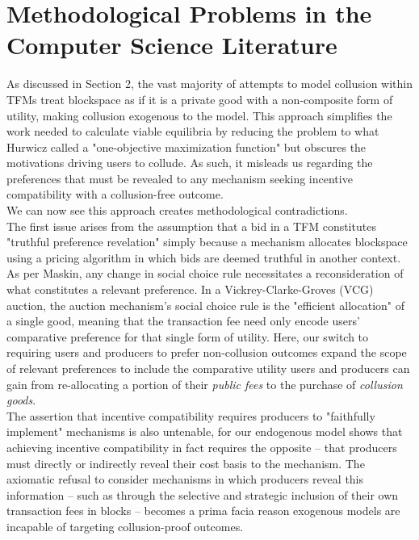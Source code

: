 \documentclass[11pt,a4paper]{llncs}
\begin{document}
\section*{Methodological Problems in the Computer Science Literature}

As discussed in Section 2, the vast majority of attempts to model collusion within TFMs treat blockspace as if it is a private good with a non-composite form of utility, making collusion exogenous to the model. This approach simplifies the work needed to calculate viable equilibria by reducing the problem to what Hurwicz called a "one-objective maximization function" but obscures the motivations driving users to collude. As such, it misleads us regarding the preferences that must be revealed to any mechanism seeking incentive compatibility with a collusion-free outcome.
\vspace{0.2cm} \\
We can now see this approach creates methodological contradictions.
\vspace{0.2cm} \\
The first issue arises from the assumption that a bid in a TFM constitutes "truthful preference revelation" simply because a mechanism allocates blockspace using a pricing algorithm in which bids are deemed truthful in another context. As per Maskin, any change in social choice rule necessitates a reconsideration of what constitutes a relevant preference. In a Vickrey-Clarke-Groves (VCG) auction, the auction mechanism's social choice rule is the "efficient allocation" of a single good, meaning that the transaction fee need only encode users' comparative preference for that single form of utility. Here, our switch to requiring users and producers to prefer non-collusion outcomes expand the scope of relevant preferences to include the comparative utility users and producers can gain from re-allocating a portion of their \textit{public fees} to the purchase of \textit{collusion goods}.
\vspace{0.2cm} \\
The assertion that incentive compatibility requires producers to "faithfully implement" mechanisms is also untenable, for our endogenous model shows that achieving incentive compatibility in fact requires the opposite -- that producers must directly or indirectly reveal their cost basis to the mechanism. The axiomatic refusal to consider mechanisms in which producers reveal this information -- such as through the selective and strategic inclusion of their own transaction fees in blocks -- becomes a prima facia reason exogenous models are incapable of targeting collusion-proof outcomes.
\end{document}
